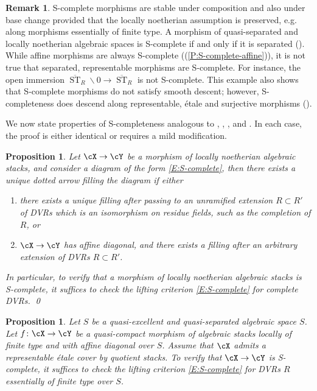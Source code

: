 \documentclass[a4paper]{amsart}
\numberwithin{equation}{section}
\theoremstyle{plain}
\newtheorem{prop}[thm]{Proposition}
\theoremstyle{definition}
\newtheorem{remark}[thm]{Remark}
\newcommand{\epf}{\qed \vspace{+10pt}}
\DeclareMathOperator{\ST}{ST}
\newcommand{\co}{\colon}
\def\oST{\overline{\ST}}
\begin{document}
\begin{remark} {\textsf{S}}-complete morphisms are stable under composition and {also under} base change {provided that the locally noetherian assumption is preserved, e.g. along morphisms essentially of finite type.}  A morphism of quasi-separated and locally noetherian algebraic spaces is {\textsf{S}}-complete if and only if it is separated ().  While affine morphisms are always {\textsf{S}}-complete ((\ref{P:S-complete-affine})), it is not true that separated, representable morphisms are {\textsf{S}}-complete.  For instance, the open immersion $\oST_R \smallsetminus 0 \to \oST_R$ is not {\textsf{S}}-complete.  This example also shows that {\textsf{S}}-complete morphisms do not satisfy smooth descent; however, {\textsf{S}}-completeness does descend along representable, \'etale and surjective morphisms ().
\end{remark}

We now state properties of {\textsf{S}}-completeness analogous to , , , and .  In each case, the proof is either identical or requires a mild modification.
\begin{prop} \label{P:S-complete-extensions}
Let $ \cX \to \cY$ be a morphism of locally noetherian algebraic stacks, and consider a diagram of the form \eqref{E:S-complete}, then there exists a unique dotted arrow filling the diagram if either
\begin{enumerate}
\item there exists a unique filling after passing to an unramified extension $R \subset R'$ of DVRs which is an isomorphism on residue fields, such as the completion of $R$, or
\item $\cX \to \cY$ has affine diagonal, and there exists a filling after an arbitrary extension of DVRs $R \subset R'$.
\end{enumerate}
In particular, to verify that a morphism of locally noetherian algebraic stacks is {\textsf{S}}-complete, it suffices to check the lifting criterion \eqref{E:S-complete} for complete DVRs. \epf
\end{prop}

\begin{prop} \label{P:S-complete-essentially-finite-type-DVRs}
{Let $S$ be a {quasi-}excellent and quasi-separated algebraic space $S$.}
Let $f \co \cX \to \cY$ be a quasi-compact morphism of algebraic stacks locally of finite type and with affine diagonal over {$S$.} {Assume that $\cX$ admits a representable \'etale cover by quotient stacks.} To verify that $\cX \to \cY$ is \textsf{S}-complete, it suffices to check the lifting criterion \eqref{E:S-complete} for DVRs $R$ essentially of finite type over $S$.
\end{prop}
\end{document}
